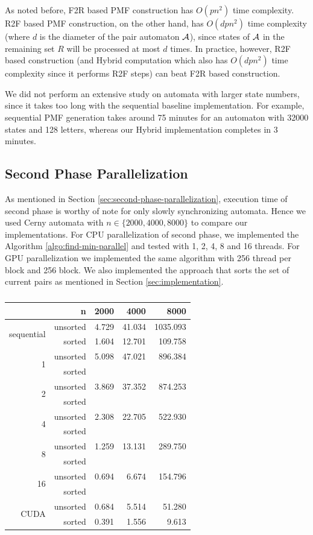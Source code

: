 \documentclass[12pt]{article}
\newcommand{\comment}[2]{{\color{red}{\bf (#1: #2)}}}
\begin{document}
As noted before, F2R based PMF construction has $O(pn^2)$ time complexity. R2F based PMF construction, on the other hand, has $O(dpn^2)$ time complexity (where $d$ is the diameter of the pair automaton ${\cal A}$), since states of ${\cal A}$ in the remaining set $R$ will be processed at most $d$ times. In practice, however, R2F based construction (and Hybrid computation which also has $O(dpn^2)$ time complexity since it performs R2F steps) can beat F2R based construction.

We did not perform an extensive study on automata with larger state numbers, since it takes too long with the sequential baseline implementation. For example, sequential PMF generation takes around 75 minutes for an automaton with 32000 states and 128 letters, whereas our Hybrid implementation completes in 3 minutes.\comment{sertac}{deneyi cuda icin tekrar atmam lazim}

\subsection{Second Phase Parallelization}

As mentioned in Section \ref{sec:second-phase-parallelization}, execution time of second phase is worthy of note for only slowly synchronizing automata. Hence we used Cerny automata with $n \in \{ 2000, 4000, 8000 \}$ to compare our implementations. For CPU parallelization of second phase, we implemented the Algorithm \ref{algo:find-min-parallel} and tested with 1, 2, 4, 8 and 16 threads. For GPU parallelization we implemented the same algorithm with 256 thread per block and 256 block. We also implemented the approach that sorts the set of current pairs as mentioned in Section \ref{sec:implementation}.


\begin{table}[ht]
	\center
	\begin{tabular}{rr|rrr}
		& n & 2000 & 4000 & 8000\\\hline
		\multirow{2}{*}{sequential} & unsorted & 4.729 & 41.034 & 1035.093\\
		& sorted & 1.604 & 12.701 & 109.758\\\hline
		\multirow{2}{*}{1} & unsorted & 5.098 & 47.021 & 896.384\\
		& sorted \\\hline
		\multirow{2}{*}{2} & unsorted & 3.869 & 37.352 & 874.253\\
		& sorted \\\hline
		\multirow{2}{*}{4} & unsorted & 2.308 & 22.705 & 522.930\\
		& sorted \\\hline
		\multirow{2}{*}{8} & unsorted & 1.259 & 13.131 & 289.750\\
		& sorted \\\hline
		\multirow{2}{*}{16} & unsorted & 0.694 & 6.674 & 154.796\\
		& sorted \\\hline
		\multirow{2}{*}{CUDA} & unsorted & 0.684 & 5.514 & 51.280\\
		& sorted & 0.391 & 1.556 & 9.613
	\end{tabular}
	\caption{}
	\label{table:phase-2-time}
\end{table}
\end{document}
